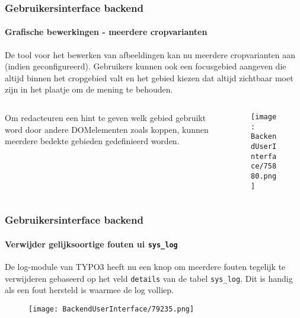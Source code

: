 \begin{frame}[fragile]
	\frametitle{Gebruikersinterface backend}
	\framesubtitle{Grafische bewerkingen - meerdere cropvarianten}

	De tool voor het bewerken van afbeeldingen kan nu meerdere cropvarianten aan (indien geconfigureerd).
	Gebruikers kunnen ook een focusgebied aangeven die altijd binnen het cropgebied valt en het gebied kiezen
	dat altijd zichtbaar moet zijn in het plaatje om de mening te behouden.%

	\begin{columns}[T]
		\begin{column}{.35\textwidth}
			Om redacteuren een hint te geven welk gebied gebruikt word door andere DOMelementen zoals
			koppen, kunnen meerdere bedekte gebieden gedefinieerd worden.
		\end{column}

		\begin{column}{.65\textwidth}
			\begin{figure}\vspace*{-0.6cm}
				\texttt{[image: BackendUserInterface/75880.png]}
			\end{figure}
		\end{column}
	\end{columns}

\end{frame}

\begin{frame}[fragile]
	\frametitle{Gebruikersinterface backend}
	\framesubtitle{Verwijder gelijksoortige fouten ui \texttt{sys\_log}}

	De log-module van TYPO3 heeft nu een knop om meerdere fouten tegelijk te verwijderen gebaseerd
	op het veld \texttt{details} van de tabel \texttt{sys\_log}. Dit is handig als een fout
	hersteld is waarmee de log volliep.

	\begin{figure}\vspace{-0.2cm}
		\texttt{[image: BackendUserInterface/79235.png]}
	\end{figure}

\end{frame}

